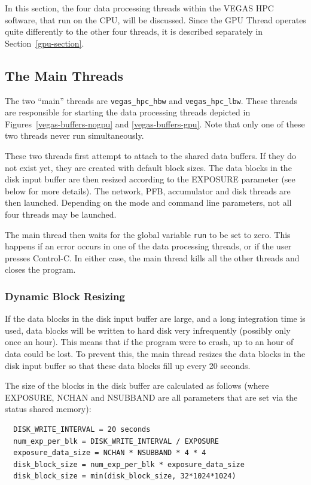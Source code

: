 \documentclass[11pt]{article} %
\begin{document}
In this section, the four data processing threads within the VEGAS HPC software, that run on the CPU, will be discussed. Since the GPU Thread operates quite differently to the other four threads, it is described separately in Section~\ref{gpu-section}.

\subsection{The Main Threads}
The two ``main'' threads are \texttt{vegas\_hpc\_hbw} and \texttt{vegas\_hpc\_lbw}. These threads are responsible for starting the data processing threads depicted in Figures~\ref{vegas-buffers-nogpu} and \ref{vegas-buffers-gpu}. Note that only one of these two threads never run simultaneously.

These two threads first attempt to attach to the shared data buffers. If they do not exist yet, they are created with default block sizes. The data blocks in the disk input buffer are then resized according to the EXPOSURE parameter (see below for more details). The network, PFB, accumulator and disk threads are then launched. Depending on the mode and command line parameters, not all four threads may be launched.

The main thread then waits for the global variable \texttt{run} to be set to zero. This happens if an error occurs in one of the data processing threads, or if the user presses Control-C. In either case, the main thread kills all the other threads and closes the program.

\subsubsection{Dynamic Block Resizing}
If the data blocks in the disk input buffer are large, and a long integration time is used, data blocks will be written to hard disk very infrequently (possibly only once an hour). This means that if the program were to crash, up to an hour of data could be lost. To prevent this, the main thread resizes the data blocks in the disk input buffer so that these data blocks fill up every 20 seconds.

The size of the blocks in the disk buffer are calculated as follows (where EXPOSURE, NCHAN and NSUBBAND are all parameters that are set via the status shared memory):

\begin{verbatim}
  DISK_WRITE_INTERVAL = 20 seconds
  num_exp_per_blk = DISK_WRITE_INTERVAL / EXPOSURE
  exposure_data_size = NCHAN * NSUBBAND * 4 * 4
  disk_block_size = num_exp_per_blk * exposure_data_size
  disk_block_size = min(disk_block_size, 32*1024*1024)
\end{verbatim}
\end{document}
